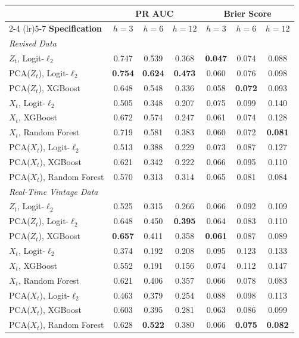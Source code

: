 \begin{tabular}{l ccc ccc}
\toprule
& \multicolumn{3}{c}{\textbf{PR AUC}} & \multicolumn{3}{c}{\textbf{Brier Score}} \\
\cmidrule(lr){2-4} \cmidrule(lr){5-7}
\textbf{Specification} & \textbf{$h=3$} & \textbf{$h=6$} & \textbf{$h=12$} & \textbf{$h=3$} & \textbf{$h=6$} & \textbf{$h=12$} \\
\midrule
\multicolumn{7}{l}{\textit{Revised Data}} \\
\quad $Z_t$, Logit-$\ell_2$ & 0.747 & 0.539 & 0.368 & \textbf{0.047} & 0.074 & 0.088 \\
\quad PCA($Z_t$), Logit-$\ell_2$ & \textbf{0.754} & \textbf{0.624} & \textbf{0.473} & 0.060 & 0.076 & 0.098 \\
\quad PCA($Z_t$), XGBoost & 0.648 & 0.548 & 0.336 & 0.058 & \textbf{0.072} & 0.093 \\
\quad $X_t$, Logit-$\ell_2$ & 0.505 & 0.348 & 0.207 & 0.075 & 0.099 & 0.140 \\
\quad $X_t$, XGBoost & 0.672 & 0.574 & 0.247 & 0.061 & 0.074 & 0.128 \\
\quad $X_t$, Random Forest & 0.719 & 0.581 & 0.383 & 0.060 & 0.072 & \textbf{0.081} \\
\quad PCA($X_t$), Logit-$\ell_2$ & 0.513 & 0.388 & 0.229 & 0.073 & 0.087 & 0.127 \\
\quad PCA($X_t$), XGBoost & 0.621 & 0.342 & 0.222 & 0.066 & 0.095 & 0.110 \\
\quad PCA($X_t$), Random Forest & 0.570 & 0.313 & 0.314 & 0.065 & 0.081 & 0.084 \\
\midrule
\multicolumn{7}{l}{\textit{Real-Time Vintage Data}} \\
\quad $Z_t$, Logit-$\ell_2$ & 0.525 & 0.315 & 0.266 & 0.066 & 0.092 & 0.109 \\
\quad PCA($Z_t$), Logit-$\ell_2$ & 0.648 & 0.450 & \textbf{0.395} & 0.064 & 0.083 & 0.110 \\
\quad PCA($Z_t$), XGBoost & \textbf{0.657} & 0.411 & 0.358 & \textbf{0.061} & 0.087 & 0.089 \\
\quad $X_t$, Logit-$\ell_2$ & 0.374 & 0.192 & 0.208 & 0.095 & 0.123 & 0.133 \\
\quad $X_t$, XGBoost & 0.552 & 0.191 & 0.156 & 0.074 & 0.112 & 0.147 \\
\quad $X_t$, Random Forest & 0.621 & 0.406 & 0.357 & 0.066 & 0.078 & 0.083 \\
\quad PCA($X_t$), Logit-$\ell_2$ & 0.463 & 0.379 & 0.254 & 0.088 & 0.098 & 0.113 \\
\quad PCA($X_t$), XGBoost & 0.603 & 0.395 & 0.281 & 0.063 & 0.086 & 0.099 \\
\quad PCA($X_t$), Random Forest & 0.628 & \textbf{0.522} & 0.380 & 0.066 & \textbf{0.075} & \textbf{0.082} \\
\bottomrule
\end{tabular}
